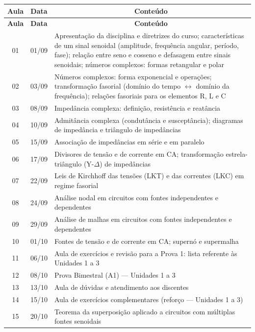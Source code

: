 \documentclass[oneside,a4paper,12pt]{article}
\begin{document}
\begin{longtable}{ |c|c|p{13cm}| }
  \hline
  \textbf{Aula}& \textbf{Data}  &  \multicolumn{1}{|c|}{\textbf{Conteúdo}} \\
  \hline
  \endfirsthead
  \hline
  \textbf{Aula}& \textbf{Data}  &  \multicolumn{1}{|c|}{\textbf{Conteúdo}} \\
  \hline
  \endhead
   01 & 01/09 & Apresentação da disciplina e diretrizes do curso; características de um sinal senoidal (amplitude, frequência angular, período, fase); relação entre seno e cosseno e defasagem entre sinais senoidais; números complexos: formas retangular e polar \\
  \hline
   02 & 03/09 & Números complexos: forma exponencial e operações; transformação fasorial (domínio do tempo $\leftrightarrow$ domínio da frequência); relações fasoriais para os elementos R, L e C \\
  \hline
   03 & 08/09 & Impedância complexa: definição, resistência e reatância \\
  \hline
   04 & 10/09 & Admitância complexa (condutância e susceptância); diagramas de impedância e triângulo de impedâncias \\
  \hline
   05 & 15/09 & Associação de impedâncias em série e em paralelo \\
  \hline
   06 & 17/09 & Divisores de tensão e de corrente em CA; transformação estrela-triângulo (Y-$\Delta$) de impedâncias \\
  \hline
   07 & 22/09 & Leis de Kirchhoff das tensões (LKT) e das correntes (LKC) em regime fasorial \\
  \hline
   08 & 24/09 & Análise nodal em circuitos com fontes independentes e dependentes \\
  \hline
   09 & 29/09 & Análise de malhas em circuitos com fontes independentes e dependentes \\
  \hline
   10 & 01/10 & Fontes de tensão e de corrente em CA; supernó e supermalha \\
  \hline
   11 & 06/10 & Aula de exercícios e revisão para a Prova 1: lista referente às Unidades 1 a 3 \\
  \hline
   12 & 08/10 & Prova Bimestral (A1) --- Unidades 1 a 3 \\
  \hline
   13 & 13/10 & Aula de dúvidas e atendimento aos discentes \\
  \hline
   14 & 15/10 & Aula de exercícios complementares (reforço --- Unidades 1 a 3) \\
  \hline
   15 & 20/10 & Teorema da superposição aplicado a circuitos com múltiplas fontes senoidais \\

\end{longtable}
\end{document}
